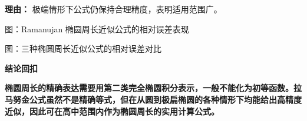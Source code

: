 \begin{proofbox}
\begin{description}[style=nextline, leftmargin=2.8em, labelsep=0.5em, itemsep=0.55em]
		      \par\textbf{理由：} 极端情形下公式仍保持合理精度，表明适用范围广。
	\end{description}
	\begin{center}
		

		\vspace{0.4em}
		{\small 图：Ramanujan 椭圆周长近似公式的相对误差表现}
	\end{center}
	\medskip

	\begin{center}
		\resizebox{0.96\linewidth}{!}{%
			
		}

		\vspace{0.35em}
		{\small 图：三种椭圆周长近似公式的相对误差对比}
	\end{center}
	\medskip
	\textbf{\textcolor{CProof}{结论回扣}}

	\textbf{椭圆周长的精确表达需要用第二类完全椭圆积分表示，一般不能化为初等函数。拉马努金公式虽然不是精确等式，但在从圆到极扁椭圆的各种情形下均能给出高精度近似，因此可在高中范围内作为椭圆周长的实用计算公式。}
\end{proofbox}
